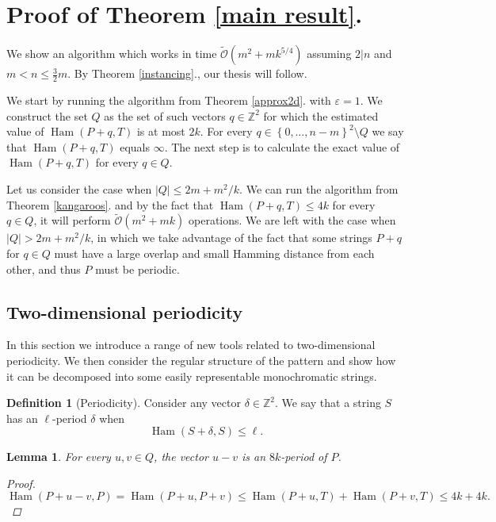 \documentclass[11pt]{article}
\newcommand{\Z}{\mathbb{Z}}
\newcommand{\tO}{\tilde{\mathcal{O}}}
\newcommand{\set}[1]{\left\lbrace #1 \right\rbrace}
\DeclareMathOperator*{\Ham}{Ham}
\theoremstyle{plain}
\newtheorem{lemma}{Lemma}
\theoremstyle{definition}
\newtheorem{definition}{Definition}
\theoremstyle{remark}
\begin{document}
\section{Proof of Theorem \ref{main result}.}
We show an algorithm which works in time $\tO(m^2 + mk^{5/4})$ assuming $2|n$ and $m < n \le \frac{3}{2}m$.
By Theorem \ref{instancing}., our thesis will follow.

We start by running the algorithm from Theorem \ref{approx2d}. with $\varepsilon = 1$.
We construct the set $Q$ as the set of such vectors $q \in \Z^2$ for which the estimated value of $\Ham(P + q, T)$ is at most $2k$.
For every $q \in \set{0, \dots, n - m}^2 \setminus Q$ we say that $\Ham(P + q, T)$ equals $\infty$.
The next step is to calculate the exact value of $\Ham(P + q, T)$ for every $q \in Q$.

Let us consider the case when $|Q| \le 2m + m^2/k$.
We can run the algorithm from Theorem \ref{kangaroos}. and by the fact that $\Ham(P + q, T) \le 4k$ for every $q \in Q$, it will perform $\tO(m^2 + mk)$ operations.
We are left with the case when $|Q| > 2m + m^2/k$, in which we take advantage of the fact that some strings $P + q$ for $q \in Q$ must have a large overlap and small Hamming distance from each other, and thus $P$ must be periodic.


\newcommand{\T}{\mathcal{T}}
\renewcommand{\S}{\mathcal{S}}
\renewcommand{\P}{\mathcal{P}}
\newcommand{\U}{\mathcal{U}}
\newcommand{\V}{\mathcal{V}}
\newcommand{\F}{\mathcal{F}}
\renewcommand{\L}{\mathcal{L}}


\subsection{Two-dimensional periodicity}
In this section we introduce a range of new tools related to two-dimensional periodicity.
We then consider the regular structure of the pattern and show how it can be decomposed into some easily representable monochromatic strings.


\begin{definition}[Periodicity]
	Consider any vector $\delta \in \Z^2$.
	We say that a string $S$ has an $\ell$-period $\delta$ when
	$$ \Ham(S + \delta, S) \le \ell. $$
\end{definition}


\begin{lemma} \label{periodicity_lemma}
	For every $u, v \in Q$, the vector $u - v$ is an $8k$-period of $P$.
	\begin{proof}
		$\Ham(P + u - v, P) = \Ham(P + u, P + v) \le \Ham(P + u, T) + \Ham(P + v, T) \le 4k + 4k. $
	\end{proof}
\end{lemma}
\end{document}
